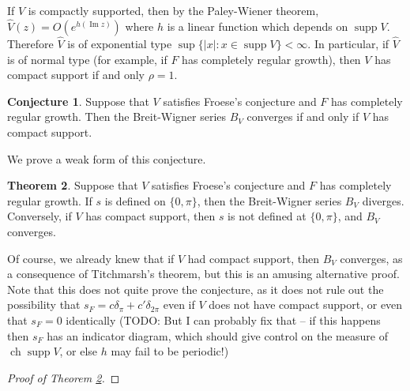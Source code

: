 \documentclass[12pt]{report}
\DeclareMathOperator{\ch}{ch}
\DeclareMathOperator{\supp}{supp}
\renewcommand{\Im}{\operatorname{Im}}
\theoremstyle{definition}
\newtheorem{theorem}{Theorem}[chapter]
\newtheorem{conjecture}[theorem]{Conjecture}
\begin{document}
If $V$ is compactly supported, then by the Paley-Wiener theorem, $\hat V(z) = O(e^{h(\Im z)})$ where $h$ is a linear function which depends on $\supp V$. Therefore $\hat V$ is of exponential type $\sup\{|x|: x \in \supp V\} < \infty$. In particular, if $\hat V$ is of normal type (for example, if $F$ has completely regular growth), then $V$ has compact support if and only $\rho = 1$.
\begin{conjecture}
Suppose that $V$ satisfies Froese's conjecture and $F$ has completely regular growth. Then the Breit-Wigner series $B_V$ converges if and only if $V$ has compact support.
\end{conjecture}
We prove a weak form of this conjecture.
\begin{theorem}
\label{divergence of breit wigner}
Suppose that $V$ satisfies Froese's conjecture and $F$ has completely regular growth. If $s$ is defined on $\{0, \pi\}$, then the Breit-Wigner series $B_V$ diverges. Conversely, if $V$ has compact support, then $s$ is not defined at $\{0, \pi\}$, and $B_V$ converges.
\end{theorem}
Of course, we already knew that if $V$ had compact support, then $B_V$ converges, as a consequence of Titchmarsh's theorem, but this is an amusing alternative proof. Note that this does not quite prove the conjecture, as it does not rule out the possibility that $s_F = c\delta_\pi + c'\delta_{2\pi}$ even if $V$ does not have compact support, or even that $s_F = 0$ identically (TODO: But I can probably fix that -- if this happens then $s_F$ has an indicator diagram, which should give control on the measure of $\ch\supp V$, or else $h$ may fail to be periodic!)

\begin{proof}[Proof of Theorem \ref{divergence of breit wigner}]
\end{proof}




\printbibliography



\printindex
\end{document}

